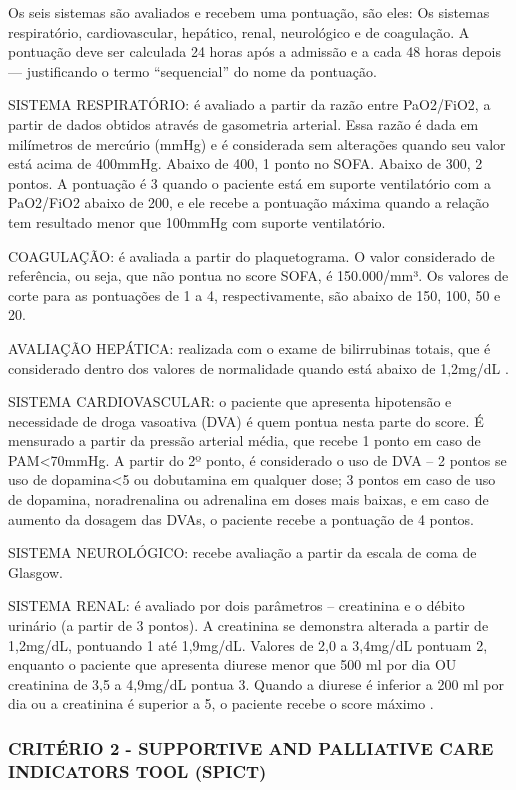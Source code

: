 \documentclass[12pt]{article}
\begin{document}
Os seis sistemas são avaliados e recebem uma pontuação, são eles: Os sistemas respiratório, cardiovascular, hepático, renal, neurológico e de coagulação. A pontuação deve ser calculada 24 horas após a admissão e a cada 48 horas depois — justificando o termo “sequencial” do nome da pontuação.

SISTEMA RESPIRATÓRIO: é avaliado a partir da razão entre PaO2/FiO2, a partir de dados obtidos através de gasometria arterial. Essa razão é dada em milímetros de mercúrio (mmHg) e é considerada sem alterações quando seu valor está acima de 400mmHg. Abaixo de 400, 1 ponto no SOFA. Abaixo de 300, 2 pontos. A pontuação é 3 quando o paciente está em suporte ventilatório com a PaO2/FiO2 abaixo de 200, e ele recebe a pontuação máxima quando a relação tem resultado menor que 100mmHg com suporte ventilatório.

COAGULAÇÃO: é avaliada a partir do plaquetograma. O valor considerado de referência, ou seja, que não pontua no score SOFA, é 150.000/mm³. Os valores de corte para as pontuações de 1 a 4, respectivamente, são abaixo de 150, 100, 50 e 20. 

AVALIAÇÃO HEPÁTICA: realizada com o exame de bilirrubinas totais, que é considerado dentro dos valores de normalidade quando está abaixo de 1,2mg/dL \cite{lambden2019sofa}.

SISTEMA CARDIOVASCULAR: o paciente que apresenta hipotensão e necessidade de droga vasoativa (DVA) é quem pontua nesta parte do score. É mensurado a partir da pressão arterial média, que recebe 1 ponto em caso de PAM<70mmHg. A partir do 2º ponto, é considerado o uso de DVA – 2 pontos se uso de dopamina<5 ou dobutamina em qualquer dose;  3 pontos em caso de uso de dopamina, noradrenalina ou adrenalina em doses mais baixas, e em caso de aumento da dosagem das DVAs, o paciente recebe a pontuação de 4 pontos.

SISTEMA NEUROLÓGICO: recebe avaliação a partir da escala de coma de Glasgow.

SISTEMA RENAL: é avaliado por dois parâmetros – creatinina e o débito urinário (a partir de 3 pontos). A creatinina se demonstra alterada a partir de 1,2mg/dL, pontuando 1 até 1,9mg/dL. Valores de 2,0 a 3,4mg/dL pontuam 2, enquanto o paciente que apresenta diurese menor que 500 ml por dia OU creatinina de 3,5 a 4,9mg/dL pontua 3. Quando a diurese é inferior a 200 ml por dia ou a creatinina é superior a 5, o paciente recebe o score máximo \cite{lambden2019sofa}.

\subsubsection{CRITÉRIO 2 - SUPPORTIVE AND PALLIATIVE CARE INDICATORS TOOL (SPICT)}
\end{document}
